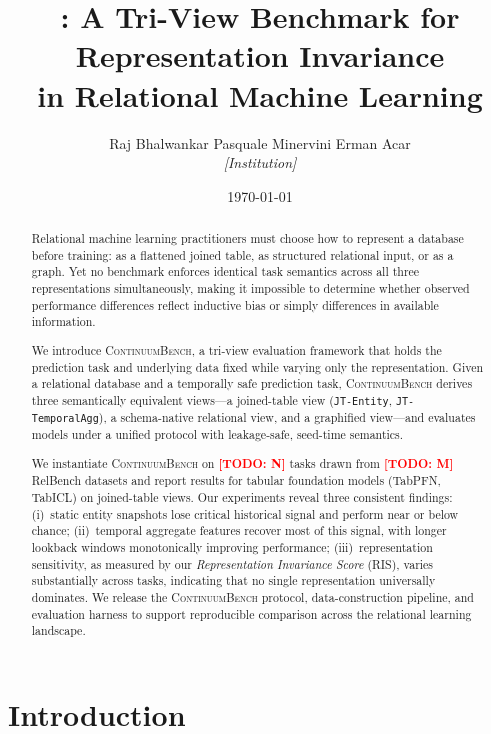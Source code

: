 \documentclass[11pt]{article}
\title{%
  \cb{}: A Tri-View Benchmark for Representation Invariance\\
  in Relational Machine Learning%
}
\author{%
  Raj Bhalwankar \quad Pasquale Minervini \quad Erman Acar\\[4pt]
  \small \textit{[Institution]}%
}
\date{\today}
\newcommand{\cb}{\textsc{ContinuumBench}}
\newcommand{\todo}[1]{\textcolor{red}{\textbf{[TODO: #1]}}}
\newcommand{\viewname}[1]{\texttt{#1}}
\begin{document}
\maketitle

\begin{abstract}
Relational machine learning practitioners must choose how to represent
a database before training: as a flattened joined table, as structured
relational input, or as a graph.
Yet no benchmark enforces identical task semantics across all three
representations simultaneously, making it impossible to determine whether
observed performance differences reflect inductive bias or simply
differences in available information.

We introduce \cb{}, a tri-view evaluation framework that holds the
prediction task and underlying data fixed while varying only the
representation.
Given a relational database and a temporally safe prediction task, \cb{}
derives three semantically equivalent views---a joined-table view
(\viewname{JT-Entity}, \viewname{JT-TemporalAgg}), a schema-native
relational view, and a graphified view---and evaluates models under a
unified protocol with leakage-safe, seed-time semantics.

We instantiate \cb{} on \todo{N} tasks drawn from
\todo{M} RelBench datasets and report results for tabular foundation
models (TabPFN, TabICL) on joined-table views.
Our experiments reveal three consistent findings: (i)~static entity
snapshots lose critical historical signal and perform near or below
chance; (ii)~temporal aggregate features recover most of this signal,
with longer lookback windows monotonically improving performance;
(iii)~representation sensitivity, as measured by our
\emph{Representation Invariance Score} (RIS), varies substantially
across tasks, indicating that no single representation universally
dominates.
We release the \cb{} protocol, data-construction pipeline, and
evaluation harness to support reproducible comparison across the
relational learning landscape.
\end{abstract}

\section{Introduction}
\label{sec:intro}
\end{document}
